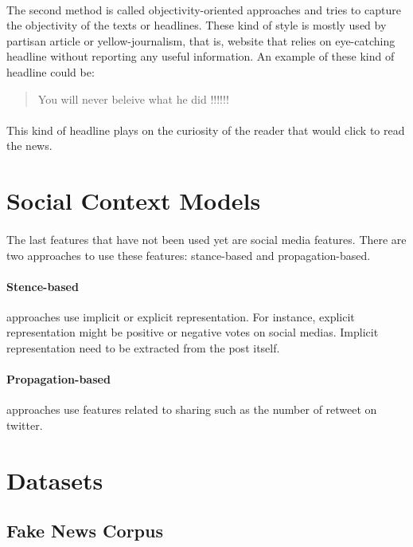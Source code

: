 \paragraph{}The second method is called objectivity-oriented approaches and tries to capture the objectivity of the texts or headlines. These kind of style is mostly used by partisan article or yellow-journalism, that is, website that relies on eye-catching headline without reporting any useful information. An example of these kind of headline could be:
	\begin{quote}You will never beleive what he did !!!!!!\end{quote}
\paragraph{} This kind of headline plays on the curiosity of the reader that would click to read the news.

\section{Social Context Models}
\paragraph{} The last features that have not been used yet are social media features. There are two approaches to use these features: stance-based and propagation-based. 

\paragraph{Stence-based} approaches use implicit or explicit representation. For instance, explicit representation might be positive or negative votes on social medias. Implicit representation need to be extracted from the post itself. 

\paragraph{Propagation-based} approaches use features related to sharing such as the number of retweet on twitter. 

\section{Datasets} \label{intro:dataset}
\subsection{Fake News Corpus}
